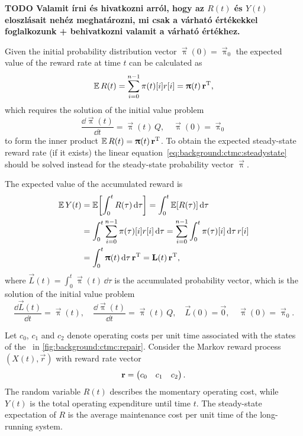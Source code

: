 \textbf{TODO Valamit írni és hivatkozni arról, hogy az $R(t)$ és
  $Y(t)$ eloszlásait nehéz meghatározni, mi csak a várható értékekkel
  foglalkozunk + behivatkozni valamit a várható értékhez.}

Given the initial probability distribution vector
$\vec{\uppi}(0) = \vec{\uppi}_0$ the expected value of the reward rate
at time $t$ can be calculated as
\begin{equation}
  \label{eq:background:ctmc:reward}
  \Ex R(t) = \sum_{i = 0}^{n - 1} \pi(t)[i] r[i] = \vec{\uppi}(t)
  \, \vec{r}^\T \text,
\end{equation}
which requires the solution of the initial value problem%
~\citep{DBLP:journals/cor/Grassmann77,reibman1989markov}
\begin{equation}
  \frac{\dd \vec{\uppi}(t)}{\dd t} = \vec{\uppi}(t) \, Q, \quad
  \vec{\uppi}(0) = \vec{\uppi}_0
\end{equation}
to form the inner product $\Ex R(t) = \vec{\uppi}(t) \, \vec{r}^\T$.
To obtain the expected steady-state reward rate (if it exists) the
linear equation~\eqref{eq:background:ctmc:steadystate} should be
solved instead for the steady-state probability vector $\vec{\uppi}$.

The expected value of the accumulated reward is
\begin{align}
  \Ex Y(t) &= \Ex\mleft[ \int_0^t R(\tau) \,\dd\tau \mright] =
             \int_0^t \Ex[R(\tau)] \,\dd\tau \\
           &= \int_0^t \sum_{i = 0}^{n - 1} \pi(\tau)[i] r[i]
             \,\dd\tau = \sum_{i = 0}^{n - 1} \int_0^t \pi(\tau)[i]
             \,\dd\tau \, r[i] \\
           &= \int_0^t \vec{\uppi}(t) \,\dd\tau \, \vec{r}^\T =
             \vec{L}(t) \, \vec{r}^\T \text,
\end{align}
where $\vec{L}(t) = \int_0^t \vec{\uppi}(t) \,\dd\tau$ is the accumulated
probability vector, which is the solution of the initial value
problem~\citep{reibman1989markov}
\begin{equation}
  \label{eq:background:ctmc:L-ivp}
  \frac{\dd \vec{L}(t)}{\dd t} = \vec{\uppi}(t), \quad \frac{\dd
    \vec{\uppi}(t)}{\dd t} = \vec{\uppi}(t) \, Q, \quad
  \vec{L}(0) = \vec{0}, \quad \vec{\uppi}(0) = \vec{\uppi}_0.
\end{equation}

\begin{example}
  Let $c_0$, $c_1$ and $c_2$ denote operating costs per unit time
  associated with the states of the \CTMC\ in
  \cref{fig:background:ctmc:repair}. Consider the Markov reward
  process $(X(t), \vec{r})$ with reward rate vector
  \begin{equation}
    \vec{r} = \begin{pmatrix} c_0 & c_1 & c_2 \end{pmatrix} \text.
  \end{equation}
  The random variable $R(t)$ describes the momentary operating cost,
  while $Y(t)$ is the total operating expenditure until time $t$. The
  steady-state expectation of $R$ is the average maintenance cost per
  unit time of the long-running system.
\end{example}

